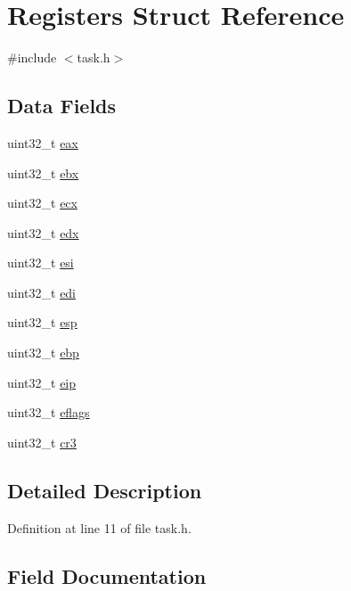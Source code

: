 \hypertarget{structRegisters}{}\section{Registers Struct Reference}
\label{structRegisters}


{\ttfamily \#include $<$task.\+h$>$}

\subsection*{Data Fields}
\begin{DoxyCompactItemize}
\item 
uint32\+\_\+t \hyperlink{structRegisters_aafc7189a84cb0f6ed3d37ee82bec09bc}{eax}
\item 
uint32\+\_\+t \hyperlink{structRegisters_a3aa9baab41ed6c513cbecb126dc90373}{ebx}
\item 
uint32\+\_\+t \hyperlink{structRegisters_a9a7eb0450238154baa25c72993a0e5e0}{ecx}
\item 
uint32\+\_\+t \hyperlink{structRegisters_a0f90c64246d3bbb917cfe527bf8c34c4}{edx}
\item 
uint32\+\_\+t \hyperlink{structRegisters_a8f9b382cca633127cb869add3aed7a41}{esi}
\item 
uint32\+\_\+t \hyperlink{structRegisters_ae94bf35e0b978f6cca838ec6011a1e48}{edi}
\item 
uint32\+\_\+t \hyperlink{structRegisters_aca352215ac1e37f833da4f6289392261}{esp}
\item 
uint32\+\_\+t \hyperlink{structRegisters_a1e7101b224fc3550bd4b64bb39d83036}{ebp}
\item 
uint32\+\_\+t \hyperlink{structRegisters_ad5110c091e713dabd23f23a62d026c07}{eip}
\item 
uint32\+\_\+t \hyperlink{structRegisters_a5216970c0d34ab4b53881f583839c8f9}{eflags}
\item 
uint32\+\_\+t \hyperlink{structRegisters_ab818d6f237e6d73d321339e6fcd66abf}{cr3}
\end{DoxyCompactItemize}


\subsection{Detailed Description}


Definition at line 11 of file task.\+h.



\subsection{Field Documentation}
